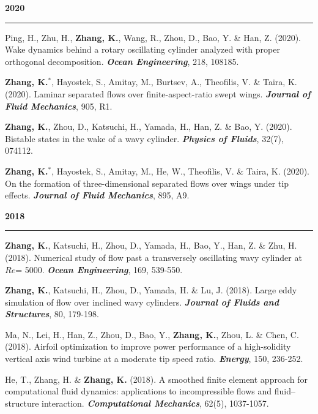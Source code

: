 \documentclass[10pt]{article}
\begin{document}
{\begin{etaremune}
 \item [] {\bf \color{Blue} 2020 \rule{14.8cm}{0.2mm}} 
 
  \item Ping, H., Zhu, H., \textbf{Zhang, K.}, Wang, R., Zhou, D., Bao, Y. \& Han, Z. (2020). Wake dynamics behind a rotary oscillating cylinder analyzed with proper orthogonal decomposition. \textit{\textbf{Ocean Engineering}}, 218, 108185.
  
  \item \textbf{Zhang, K.}$^*$, Hayostek, S., Amitay, M., Burtsev, A., Theofilis, V. \& Taira, K. (2020). Laminar separated flows over finite-aspect-ratio swept wings. \textit{\textbf{Journal of Fluid Mechanics}}, 905, R1.
  
  \item \textbf{Zhang, K.}, Zhou, D., Katsuchi, H., Yamada, H., Han, Z. \& Bao, Y. (2020). Bistable states in the wake of a wavy cylinder. \textit{\textbf{Physics of Fluids}}, 32(7), 074112.
  
  \item \textbf{Zhang, K.}$^*$, Hayostek, S., Amitay, M., He, W., Theofilis, V. \& Taira, K. (2020). On the formation of three-dimensional separated flows over wings under tip effects. \textit{\textbf{Journal of Fluid Mechanics}}, 895, A9.

 \item [] {\bf \color{Blue} 2018 \rule{14.8cm}{0.2mm}} 

  \item \textbf{Zhang, K.}, Katsuchi, H., Zhou, D., Yamada, H., Bao, Y., Han, Z. \& Zhu, H. (2018). Numerical study of flow past a transversely oscillating wavy cylinder at $Re$= 5000. \textit{\textbf{Ocean Engineering}}, 169, 539-550.
  
  \item \textbf{Zhang, K.}, Katsuchi, H., Zhou, D., Yamada, H. \& Lu, J. (2018). Large eddy simulation of flow over inclined wavy cylinders. \textit{\textbf{Journal of Fluids and Structures}}, 80, 179-198.
  
  \item Ma, N., Lei, H., Han, Z., Zhou, D., Bao, Y., \textbf{Zhang, K.}, Zhou, L. \& Chen, C. (2018). Airfoil optimization to improve power performance of a high-solidity vertical axis wind turbine at a moderate tip speed ratio. \textit{\textbf{Energy}}, 150, 236-252.
  
  \item He, T., Zhang, H. \& \textbf{Zhang, K.} (2018). A smoothed finite element approach for computational fluid dynamics: applications to incompressible flows and fluid–structure interaction. \textit{\textbf{Computational Mechanics}}, 62(5), 1037-1057.


\end{etaremune}}
\end{document}
